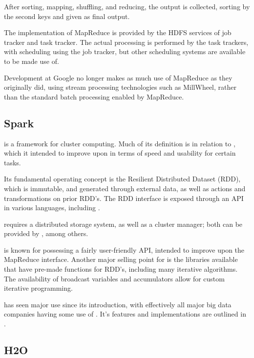 After sorting, mapping, shuffling, and reducing, the output is collected, sorting by the second keys and given as final output.

The implementation of MapReduce is provided by the HDFS services of job tracker and task tracker.
The actual processing is performed by the task trackers, with scheduling using the job tracker, but other scheduling systems are available to be made use of.

Development at Google no longer makes as much use of MapReduce as they originally did, using stream processing technologies such as MillWheel, rather than the standard batch processing enabled by MapReduce\cite{akidau2013millwheel}.

\subsection{Spark}\label{sec:spark}

 is a framework for cluster computing\cite{zaharia2010spark}.
Much of its definition is in relation to , which it intended to improve upon in terms of speed and usability for certain tasks.

Its fundamental operating concept is the Resilient Distributed Dataset (RDD), which is immutable, and generated through external data, as well as actions and transformations on prior RDD's.
The RDD interface is exposed through an API in various languages, including \R{}.

 requires a distributed storage system, as well as a cluster
manager; both can be provided by , among others.

 is known for possessing a fairly user-friendly API, intended to
improve upon the MapReduce interface.
Another major selling point for  is the libraries available that have pre-made functions for RDD's, including many iterative algorithms.
The availability of broadcast variables and accumulators allow for custom iterative programming.

 has seen major use since its introduction, with effectively all
major big data companies having some use of .
It's features and implementations are outlined in \textcite{zaharia2016apache}.

\subsection{H2O}\label{sec:h2o}

